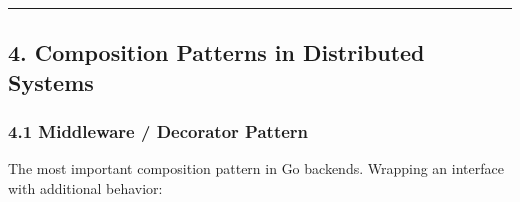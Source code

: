 \documentclass[
]{article}
\begin{document}
\begin{center}\rule{0.5\linewidth}{0.5pt}\end{center}

\hypertarget{composition-patterns-in-distributed-systems}{%
\subsection{4. Composition Patterns in Distributed
Systems}\label{composition-patterns-in-distributed-systems}}

\hypertarget{middleware-decorator-pattern}{%
\subsubsection{4.1 Middleware / Decorator
Pattern}\label{middleware-decorator-pattern}}

The most important composition pattern in Go backends. Wrapping an
interface with additional behavior:
\end{document}
